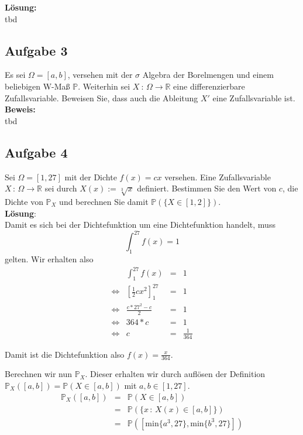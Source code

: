 \documentclass[11pt,a4paper,ngerman]{article}
\begin{document}
\textbf{Lösung:}\\

tbd


\subsection*{Aufgabe 3}

Es sei $\Omega = [a,b]$, versehen mit der $\sigma$ Algebra der Borelmengen und einem beliebigen W-Maß $\mathbb{P}$. Weiterhin sei $X \ : \, \Omega \rightarrow \mathbb{R}$ eine
differenzierbare Zufallsvariable. Beweisen Sie, dass auch die Ableitung $X'$ eine Zufallsvariable ist.\\

\textbf{Beweis:}\\

tbd


\subsection*{Aufgabe 4}

Sei $\Omega = [1,27]$ mit der Dichte $f(x) = cx$ versehen. Eine Zufallsvariable $X \, : \, \Omega \rightarrow \mathbb{R}$ sei durch $X(x) := \sqrt[3]{x}$ definiert.
Bestimmen Sie den Wert von $c$, die Dichte von $\mathbb{P}_X$ und berechnen Sie damit $\mathbb{P}(\{X \in [1,2]\})$.\\

\textbf{Lösung}:\\

Damit es sich bei der Dichtefunktion um eine Dichtefunktion handelt, muss
\[
    \int_1^{27} f(x) = 1
\]
gelten.
Wir erhalten also
$$\begin{array}{crcl}
                & \int_1^{27} f(x) &=& 1\\
\Leftrightarrow & \left[ \frac{1}{2} cx^2\right]_1^{27} & = & 1\\
\Leftrightarrow & \frac{c*27^2 - c}{2} & = & 1\\
\Leftrightarrow & 364 * c &=& 1\\
\Leftrightarrow & c &=& \frac{1}{364}
\end{array}$$

Damit ist die Dichtefunktion also $f(x) = \frac{x}{364}$.

Berechnen wir nun $\mathbb{P}_X$. Dieser erhalten wir durch auflösen der Definition $\mathbb{P}_X([a,b]) = \mathbb{P}(X \in [a,b])$ mit $a,b \in [1,27]$.
$$\begin{array}{rlc}
    \mathbb{P}_X([a,b]) &=& \mathbb{P}(X \in [a,b])\\
                        &=& \mathbb{P}(\{x \, : \, X(x) \in [a,b]\})\\
                        &=& \mathbb{P}([\text{min}\{a^3,27\},\text{min}\{b^3,27\}])\\
\end{array}$$
\end{document}
